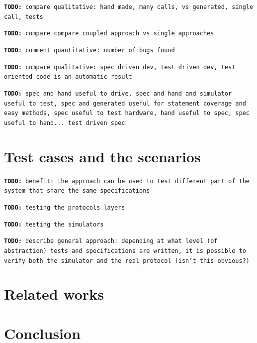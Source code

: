 \documentclass{article} \usepackage{times}
\newcommand{\todo}[1]{\texttt{\textbf{TODO:} #1}}
\begin{document}
\todo{compare qualitative: hand made, many calls, vs generated, single call, tests}

\todo{compare compare coupled approach vs single approaches}

\todo{comment quantitative: number of bugs found}

\todo{compare qualitative: spec driven dev, test driven dev, test
  oriented code is an automatic result}

\todo{spec and hand useful to drive, spec and hand and simulator
  useful to test, spec and generated useful for statement coverage and
  easy methods, spec useful to test hardware, hand useful to spec,
  spec useful to hand... test driven spec}


\section{Test cases and the scenarios}
\label{sec:test_cases_and_the_scenarios}

\todo{benefit: the approach can be used to test different part of the system
that share the same specifications}

\todo{testing the protocols layers}

\todo{testing the simulators}

\todo{describe general approach: depending at what level (of abstraction) tests 
and specifications are written, it is possible to verify both the simulator and 
the real protocol (isn't this obvious?)}


\section{Related works}
\label{sec:related_works}

\section{Conclusion}
\label{sec:conclusion}





\end{document}
